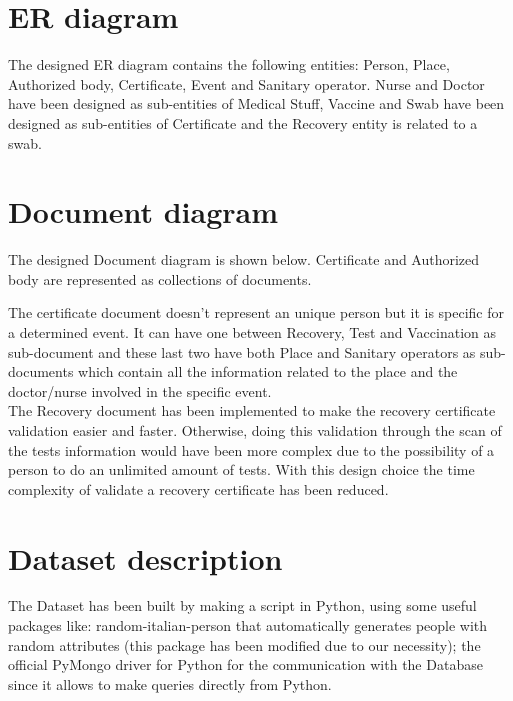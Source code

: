 \documentclass{article}
\begin{document}
\section{ER diagram}
The designed ER diagram contains the following entities: Person, Place, Authorized body, Certificate, Event and Sanitary operator. Nurse and Doctor have been designed as sub-entities of Medical Stuff, Vaccine and Swab have been designed as sub-entities of Certificate and the Recovery entity is related to a swab. 


\newpage

\section{Document diagram}
The designed Document diagram is shown below. Certificate and Authorized body are represented as collections of documents.

The certificate document doesn't represent an unique person but it is specific for a determined event. It can have one between Recovery, Test and Vaccination as sub-document and these last two have both Place and Sanitary operators as sub-documents which contain all the information related to the place and the doctor/nurse involved in the specific event.
\hfill\break
\\
The Recovery document has been implemented to make the recovery certificate validation easier and faster. Otherwise, doing this validation through the scan of the tests information would have been more complex due to the possibility of a person to do an unlimited amount of tests.
With this design choice the time complexity of validate a recovery certificate has been reduced.




\newpage

\section{Dataset description}
The Dataset has been built by making a script in Python, using some useful packages like: random-italian-person that automatically generates people with random attributes (this package has been modified due to our necessity); the official PyMongo driver for Python for the communication with the Database since it allows to make queries directly from Python.
\end{document}
